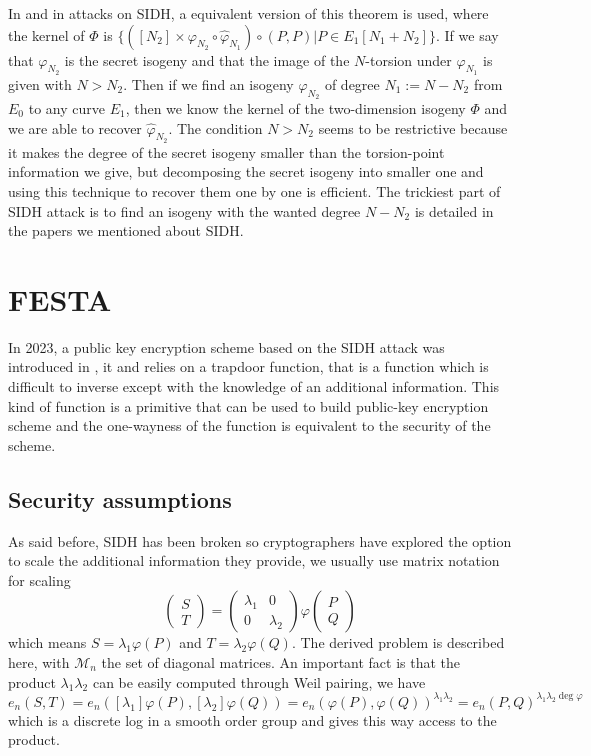 \documentclass[12pt,a4paper]{article}
\begin{document}
		In \cite{directkeysidh} and in attacks on SIDH, a equivalent version of this theorem
		is used, where the kernel of $\Phi$ is $\{([N_2]\times\varphi_{N_2}\circ\widehat\varphi_{N_1})
			\circ (P,P)|P\in E_1[N_1+N_2]\}$. If we 
		say that $\varphi_{N_2}$ is the secret isogeny and that the image of the $N$-torsion under
		$\varphi_{N_1}$ is given with $N>N_2$. Then if we find an isogeny $\varphi_{N_2}$ of degree 
		$N_1 := N - N_2$ from  $E_0$ to any curve $E_1$, then we know the kernel of the two-dimension
		isogeny $\Phi$ and we are able to recover $\widehat\varphi_{N_2}$. The condition $N>N_2$ seems to
		be restrictive because it makes the degree of the secret isogeny smaller than the torsion-point
		information we give, but decomposing the secret isogeny into smaller one and using this technique to
		recover them one by one is efficient. The trickiest part of SIDH attack is to find an isogeny with the
		wanted degree $N - N_2$ is detailed in the papers we mentioned about SIDH.


		\section{FESTA}
		In 2023, a public key encryption scheme based on the SIDH attack was introduced
		in \cite{FESTA}, it and relies on a trapdoor function, that is a function which is
		difficult to inverse except with the knowledge of an additional information. This kind
		of function is a primitive that can be used to build public-key encryption scheme
		and the one-wayness of the function is equivalent to the security of the scheme.

		\subsection{Security assumptions}
			As said before, SIDH has been broken so cryptographers have explored the option to scale
			the additional information they provide, we usually use matrix notation for scaling
			\[
				\begin{pmatrix} S \\ T \end{pmatrix} = \begin{pmatrix} \lambda_1 & 0\\ 0 & \lambda_2 \end{pmatrix} 	
				\varphi \begin{pmatrix} P \\ Q \end{pmatrix} 
			\] 
			which means $S=\lambda_1\varphi(P)$ and $T=\lambda_2\varphi(Q)$. The derived problem is described
			here, with $\mathcal M_n$ the set of diagonal matrices. An important fact is that the product
			$\lambda_1\lambda_2$ can be easily computed through Weil pairing, we have
			$$e_n(S,T)=e_n([\lambda_1]\varphi(P),[\lambda_2]\varphi(Q))=
			e_n(\varphi(P),\varphi(Q))^{\lambda_1\lambda_2}=e_n(P,Q)^{\lambda_1\lambda_2\deg\varphi}$$
			which is a discrete log in a smooth order group and gives this way access to the product.
			 
\end{document}
